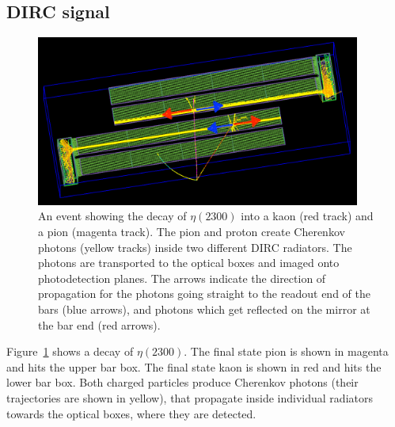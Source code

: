 \subsection{DIRC signal}

\begin{figure}[!h]
\centering
\includegraphics[width=0.95\textwidth]{pics/dir_ref.png}%
\caption{\label{pic:eta2300}
An event showing the decay of $\eta(2300)$ into a kaon (red track) and a pion (magenta track). 
The pion and proton create Cherenkov photons (yellow tracks) inside two different DIRC radiators. The photons are transported to the optical boxes and imaged onto photodetection planes. The arrows indicate the direction of propagation for the photons going straight to the readout end of the bars (blue arrows), and photons which get reflected on the mirror at the bar end (red arrows). 
}
\end{figure}

Figure~\ref{pic:eta2300} shows a decay of $\eta(2300)$. The final state pion is shown in magenta and hits the upper bar box. The final state kaon is shown in red and hits the lower bar box. Both charged particles produce Cherenkov photons (their trajectories are shown in yellow), that propagate inside individual radiators towards the optical boxes, where they are detected. 

